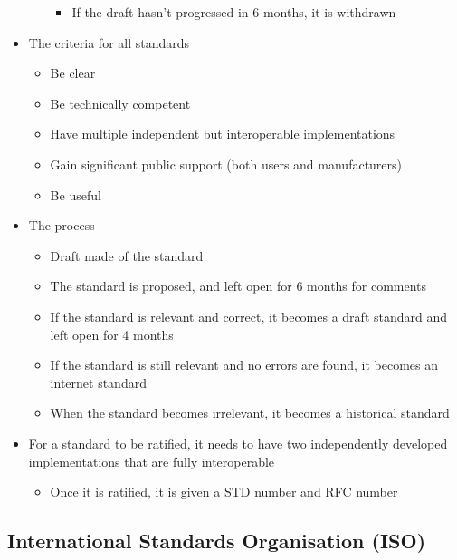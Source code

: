 \begin{itemize}
\begin{itemize}
    \begin{itemize}
      \item If the draft hasn't progressed in 6 months, it is withdrawn
    \end{itemize}
  \end{itemize}
  \item The criteria for all standards
  \begin{itemize}
    \item Be clear
    \item Be technically competent
    \item Have multiple independent but interoperable implementations
    \item Gain significant public support (both users and manufacturers)
    \item Be useful
  \end{itemize}
  \item The process
  \begin{itemize}
    \item Draft made of the standard
    \item The standard is proposed, and left open for 6 months for comments
    \item If the standard is relevant and correct, it becomes a draft standard and left open for 4 months
    \item If the standard is still relevant and no errors are found, it becomes an internet standard
    \item When the standard becomes irrelevant, it becomes a historical standard
  \end{itemize}
  \item For a standard to be ratified, it needs to have two independently developed implementations that are fully interoperable
  \begin{itemize}
    \item Once it is ratified, it is given a STD number and RFC number
  \end{itemize}
\end{itemize}

\subsection*{International Standards Organisation (ISO)}

